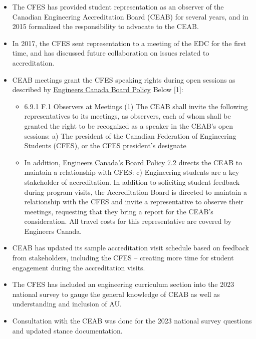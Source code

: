 \begin{itemize}
 \item The CFES has provided student representation as an observer of the Canadian Engineering Accreditation Board (CEAB) for several years, and in 2015 formalized the responsibility to advocate to the CEAB.
 \item In 2017, the CFES sent representation to a meeting of the EDC for the first time, and has discussed future collaboration on issues related to accreditation.
 \item CEAB meetings grant the CFES speaking rights during open sessions as described by \href{https://engineerscanada.ca/sites/default/files/2022-02/Board-Policy-Manual-Combined-e.pdf}{Engineers Canada Board Policy} Below [1]:
 \begin{itemize}
  \item 6.9.1 F.1 Observers at Meetings (1) The CEAB shall invite the following representatives to its meetings, as observers, each of whom shall be granted the right to be recognized as a speaker in the CEAB's open sessions: a) The president of the Canadian Federation of Engineering Students (CFES), or the CFES president's designate
  \item In addition, \href{https://engineerscanada.ca/sites/default/files/2022-02/Board-Policy-Manual-Combined-e.pdf}{Engineers Canada's Board Policy 7.2} directs the CEAB to maintain a relationship with CFES: c) Engineering students are a key stakeholder of accreditation. In addition to soliciting student feedback during program visits, the Accreditation Board is directed to maintain a relationship with the CFES and invite a representative to observe their meetings, requesting that they bring a report for the CEAB's consideration. All travel costs for this representative are covered by Engineers Canada.
 \end{itemize}
 \item CEAB has updated its sample accreditation visit schedule based on feedback from stakeholders, including the CFES -- creating more time for student engagement during the accreditation visits.
 \item The CFES has included an engineering curriculum section into the 2023 national survey to gauge the general knowledge of CEAB as well as understanding and inclusion of AU.
 \item Consultation with the CEAB was done for the 2023 national survey questions and updated stance documentation.
\end{itemize}

